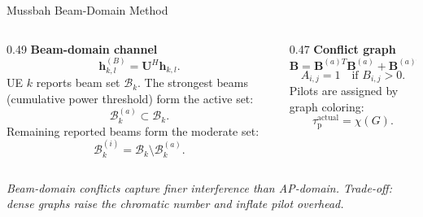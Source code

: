 \documentclass[10pt,aspectratio=169]{beamer}
\newcommand{\tauactual}{\tau_{\mathrm{p}}^{\mathrm{actual}}}
\newcommand{\callout}[1]{%
    \vspace{0.3em}
    {\footnotesize\itshape #1}
}
\begin{document}
\begin{frame}{Mussbah Beam-Domain Method}
    \small
    \begin{columns}[T,onlytextwidth]
        \begin{column}{0.49\textwidth}
            \textbf{Beam-domain channel}
            \[
                \mathbf{h}_{k,l}^{(B)}=\mathbf{U}^{H}\mathbf{h}_{k,l}.
            \]
            UE \(k\) reports beam set \(\mathcal{B}_k\). The strongest beams (cumulative power threshold) form the active set:
            \[
                \mathcal{B}_k^{(a)} \subset \mathcal{B}_k.
            \]
            Remaining reported beams form the moderate set:
            \[
                \mathcal{B}_k^{(i)}
                =
                \mathcal{B}_k\setminus\mathcal{B}_k^{(a)}.
            \]
        \end{column}
        \begin{column}{0.47\textwidth}
            \textbf{Conflict graph}
            \[
                \mathbf{B}
                =
                \mathbf{B}^{(a)T}\mathbf{B}^{(a)}
                +
                \mathbf{B}^{(a)T}\mathbf{B}^{(i)}
                +
                \mathbf{B}^{(i)T}\mathbf{B}^{(a)}.
            \]
            \[
                A_{i,j}=1 \quad \text{if } B_{i,j}>0.
            \]
            Pilots are assigned by graph coloring:
            \[
                \tauactual = \chi(G).
            \]
        \end{column}
    \end{columns}

    \vspace{0.4em}
    \callout{Beam-domain conflicts capture finer interference than AP-domain. Trade-off: dense graphs raise the chromatic number and inflate pilot overhead.}
\end{frame}
\end{document}
